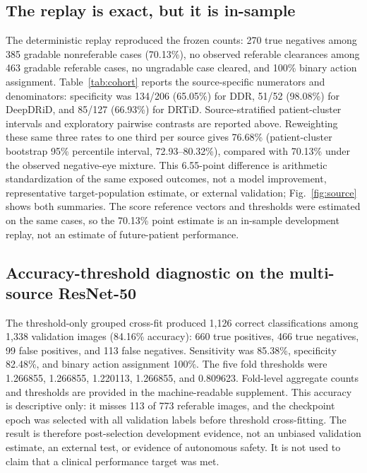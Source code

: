 \documentclass[11pt]{article}
\begin{document}
\subsection{The replay is exact, but it is in-sample}
The deterministic replay reproduced the frozen counts: 270 true negatives among 385 gradable nonreferable cases (70.13\%), no observed referable clearances among 463 gradable referable cases, no ungradable case cleared, and 100\% binary action assignment. Table~\ref{tab:cohort} reports the source-specific numerators and denominators: specificity was 134/206 (65.05\%) for DDR, 51/52 (98.08\%) for DeepDRiD, and 85/127 (66.93\%) for DRTiD. Source-stratified patient-cluster intervals and exploratory pairwise contrasts are reported above. Reweighting these same three rates to one third per source gives 76.68\% (patient-cluster bootstrap 95\% percentile interval, 72.93--80.32\%), compared with 70.13\% under the observed negative-eye mixture. This 6.55-point difference is arithmetic standardization of the same exposed outcomes, not a model improvement, representative target-population estimate, or external validation; Fig.~\ref{fig:source} shows both summaries. The score reference vectors and thresholds were estimated on the same cases, so the 70.13\% point estimate is an in-sample development replay, not an estimate of future-patient performance.

\subsection{Accuracy-threshold diagnostic on the multi-source ResNet-50}
The threshold-only grouped cross-fit produced 1,126 correct classifications among 1,338 validation images (84.16\% accuracy): 660 true positives, 466 true negatives, 99 false positives, and 113 false negatives. Sensitivity was 85.38\%, specificity 82.48\%, and binary action assignment 100\%. The five fold thresholds were 1.266855, 1.266855, 1.220113, 1.266855, and 0.809623. Fold-level aggregate counts and thresholds are provided in the machine-readable supplement. This accuracy is descriptive only: it misses 113 of 773 referable images, and the checkpoint epoch was selected with all validation labels before threshold cross-fitting. The result is therefore post-selection development evidence, not an unbiased validation estimate, an external test, or evidence of autonomous safety. It is not used to claim that a clinical performance target was met.
\end{document}
